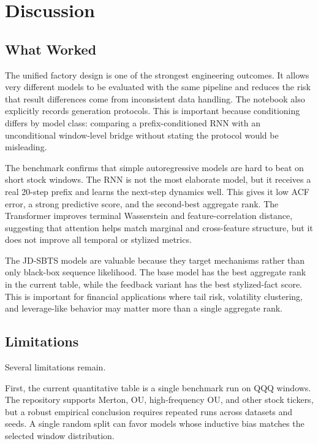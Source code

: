 \documentclass[11pt,a4paper]{article}
\begin{document}
\section{Discussion}

\subsection{What Worked}

The unified factory design is one of the strongest engineering outcomes. It
allows very different models to be evaluated with the same pipeline and reduces
the risk that result differences come from inconsistent data handling. The
notebook also explicitly records generation protocols. This is important
because conditioning differs by model class: comparing a prefix-conditioned RNN
with an unconditional window-level bridge without stating the protocol would be
misleading.

The benchmark confirms that simple autoregressive models are hard to beat on
short stock windows. The RNN is not the most elaborate model, but it receives a
real 20-step prefix and learns the next-step dynamics well. This gives it low
ACF error, a strong predictive score, and the second-best aggregate rank. The
Transformer improves terminal Wasserstein and feature-correlation distance,
suggesting that attention helps match marginal and cross-feature structure, but
it does not improve all temporal or stylized metrics.

The JD-SBTS models are valuable because they target mechanisms rather than only
black-box sequence likelihood. The base model has the best aggregate rank in
the current table, while the feedback variant has the best stylized-fact score.
This is important for financial applications where tail risk, volatility
clustering, and leverage-like behavior may matter more than a single aggregate
rank.

\subsection{Limitations}

Several limitations remain.

First, the current quantitative table is a single benchmark run on QQQ windows.
The repository supports Merton, OU, high-frequency OU, and other stock tickers,
but a robust empirical conclusion requires repeated runs across datasets and
seeds. A single random split can favor models whose inductive bias matches the
selected window distribution.
\end{document}
